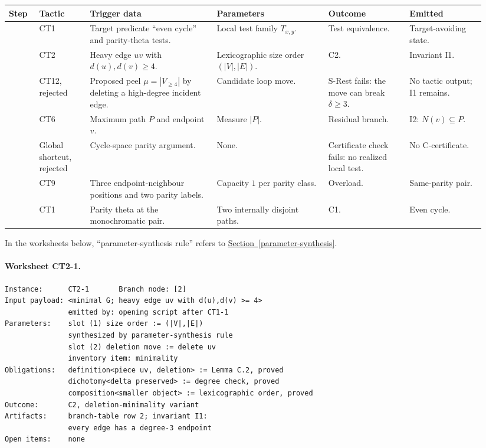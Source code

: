 \documentclass[
  11pt,
]{article}
\theoremstyle{definition}
\newcommand{\secref}[1]{\hyperref[#1]{Section~\ref*{#1}}}
\begin{document}
\begingroup
\scriptsize
\setlength{\tabcolsep}{1.8pt}
\begin{longtable}[]{@{}
  >{\raggedright\arraybackslash}p{0.06\linewidth}
  >{\raggedright\arraybackslash}p{0.10\linewidth}
  >{\raggedright\arraybackslash}p{0.25\linewidth}
  >{\raggedright\arraybackslash}p{0.22\linewidth}
  >{\raggedright\arraybackslash}p{0.16\linewidth}
  >{\raggedright\arraybackslash}p{0.15\linewidth}@{}}
\toprule\noalign{}
Step & Tactic & Trigger data & Parameters & Outcome & Emitted \\
\midrule\noalign{}
\endhead
\bottomrule\noalign{}
\endlastfoot
1 & CT1 & Target predicate ``even cycle'' and parity-theta tests. & Local test family \(T_{x,y}\). & Test equivalence. & Target-avoiding state. \\
2 & CT2 & Heavy edge \(uv\) with \(d(u),d(v)\ge4\). & Lexicographic size order \((|V|,|E|)\). & C2. & Invariant I1. \\
3 & CT12, rejected & Proposed peel \(\mu=|V_{\ge4}|\) by deleting a high-degree incident edge. & Candidate loop move. & S-Rest fails: the move can break \(\delta\ge3\). & No tactic output; I1 remains. \\
4 & CT6 & Maximum path \(P\) and endpoint \(v\). & Measure \(|P|\). & Residual branch. & I2: \(N(v)\subseteq P\). \\
5 & Global shortcut, rejected & Cycle-space parity argument. & None. & Certificate check fails: no realized local test. & No C-certificate. \\
6 & CT9 & Three endpoint-neighbour positions and two parity labels. & Capacity \(1\) per parity class. & Overload. & Same-parity pair. \\
7 & CT1 & Parity theta at the monochromatic pair. & Two internally disjoint paths. & C1. & Even cycle. \\
\end{longtable}
\endgroup

In the worksheets below, ``parameter-synthesis rule'' refers to
\secref{parameter-synthesis}.

\paragraph{Worksheet CT2-1.}
\begingroup
\small
\begin{verbatim}
Instance:      CT2-1       Branch node: [2]
Input payload: <minimal G; heavy edge uv with d(u),d(v) >= 4>
               emitted by: opening script after CT1-1
Parameters:    slot (1) size order := (|V|,|E|)
               synthesized by parameter-synthesis rule
               slot (2) deletion move := delete uv
               inventory item: minimality
Obligations:   definition<piece uv, deletion> := Lemma C.2, proved
               dichotomy<delta preserved> := degree check, proved
               composition<smaller object> := lexicographic order, proved
Outcome:       C2, deletion-minimality variant
Artifacts:     branch-table row 2; invariant I1:
               every edge has a degree-3 endpoint
Open items:    none
\end{verbatim}
\endgroup
\end{document}

